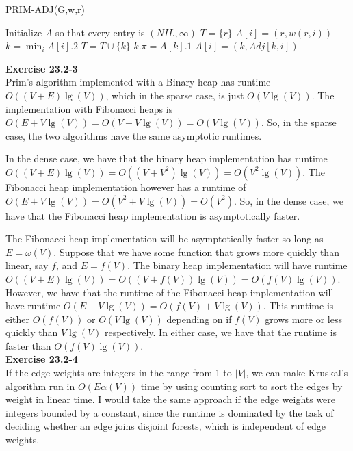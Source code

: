 \documentclass{article}
\begin{document}
\begin{algorithm}
\caption{PRIM-ADJ(G,w,r)}
\begin{algorithmic}
\State Initialize $A$ so that every entry is $(NIL,\infty)$
\State $T = \{r\}$
		\State $A[i] = (r, w(r,i))$
	\EndIf
\EndFor
{}
	\State $k = \min_{i} A[i].2$
	\State $T = T \cup \{k\}$
	\State $k.\pi = A[k].1$
			\State $A[i] = (k, Adj[k,i])$
		\EndIf
	\EndFor
\EndFor
\end{algorithmic}
\end{algorithm}

\noindent\textbf{Exercise 23.2-3}\\

Prim's algorithm implemented with a Binary heap has runtime $O((V+E)\lg(V))$, which in the sparse case, is just $O(V\lg(V))$. The implementation with Fibonacci heaps is $O(E+V\lg(V)) = O(V+ V\lg(V)) = O(V\lg(V))$. So, in the sparse case, the two algorithms have the same asymptotic runtimes.

In the dense case, we have that the binary heap implementation has runtime $O((V+E)\lg(V)) = O((V+V^2)\lg(V)) = O(V^2\lg(V))$. The Fibonacci heap implementation however has a runtime of $O(E + V\lg(V)) = O(V^2 + V\lg(V)) = O(V^2)$. So, in the dense case, we have that the Fibonacci heap implementation is asymptotically faster.

The Fibonacci heap implementation will be asymptotically faster so long as $E = \omega(V)$. Suppose that we have some function that grows more quickly than linear, say $f$, and $E = f(V)$. The binary heap implementation will have runtime $O((V+E)\lg(V)) = O((V+f(V))\lg(V)) = O(f(V)\lg(V))$. However, we have that the runtime of the Fibonacci heap implementation will have runtime $O(E+ V\lg(V)) = O(f(V) + V\lg(V))$. This runtime is either $O(f(V))$ or $O(V\lg(V))$ depending on if $f(V)$ grows more or less quickly than $V\lg(V)$ respectively. In either case, we have that the runtime is faster than $O(f(V)\lg(V))$.\\

\noindent\textbf{Exercise 23.2-4}\\

If the edge weights are integers in the range from 1 to $|V|$, we can make Kruskal's algorithm run in $O(E\alpha(V))$ time by using counting sort to sort the edges by weight in linear time.  I would take the same approach if the edge weights were integers bounded by a constant, since the runtime is dominated by the task of deciding whether an edge joins disjoint forests, which is independent of edge weights. \\
\end{document}
